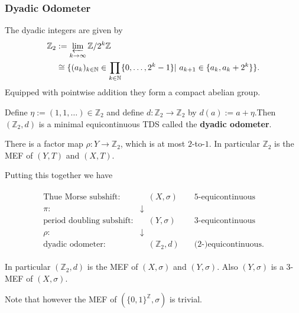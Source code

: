 \begin{frame}
	\frametitle{Dyadic Odometer}
	The dyadic integers are given by
	\begin{align*}
		\mathbb{Z}_2 &:= \varprojlim_{k \to \infty} \mathbb{Z}/2^k\mathbb{Z}\\
		&\cong \{(a_k)_{k \in \mathbb{N}} \in \prod_{k \in \mathbb{N}} \{0, \dots, 2^k-1\}|\ a_{k+1} \in \{a_k, a_k + 2^k\}\}.
	\end{align*}\pause
	Equipped with pointwise addition they form a compact abelian group.\pause
	
	Define $\eta := (1, 1, \dots) \in \mathbb{Z}_2$ and define $d: \mathbb{Z}_2 \to \mathbb{Z}_2$ by $d(a) := a + \eta$.\pause Then $(\mathbb{Z}_2, d)$ is a minimal equicontinuous TDS called the \textbf{dyadic odometer}.\pause
	\medskip
	
	There is a factor map $\rho: Y \to \mathbb{Z}_2$, which is at most $2$-to-$1$. In particular $\mathbb{Z}_2$ is the MEF of $(Y, T)$ and $(X, T)$.
\end{frame}

\begin{frame}
	Putting this together we have
	\medskip
	
	\begin{align*}
		\begin{array}{rcc}
			\text{Thue Morse subshift:} &\quad (X, \sigma) \quad &5\text{-equicontinuous}\\
			\pi: &\downarrow &\\
			\text{period doubling subshift:} &\quad (Y, \sigma) \quad &3\text{-equicontinuous}\\
			\rho: &\downarrow &\\
			\text{dyadic odometer:} &\quad (\mathbb{Z}_2, d) \quad &\text{(2-)equicontinuous.}
		\end{array}
	\end{align*}
	\medskip

	In particular $(\mathbb{Z}_2, d)$ is the MEF of $(X, \sigma)$ and $(Y, \sigma)$. Also $(Y, \sigma)$ is a $3$-MEF of $(X, \sigma)$.
	
	Note that however the MEF of $(\{0, 1\}^\mathbb{Z}, \sigma)$ is trivial.
\end{frame}
